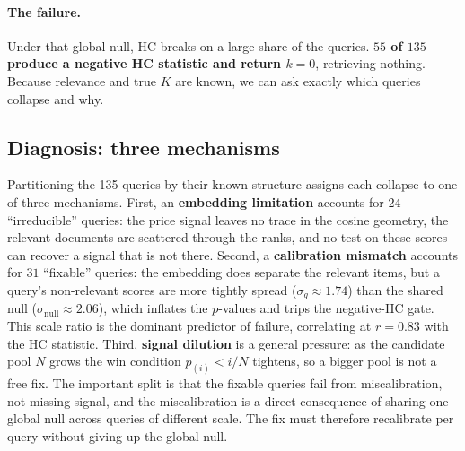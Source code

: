 \documentclass[letterpaper]{article}
\newcommand{\AmFailN}{55}\newcommand{\AmTotN}{135}
\newcommand{\AmIrrN}{24}\newcommand{\AmFixN}{31}\newcommand{\AmPosN}{77}
\newcommand{\AmSigQ}{1.74}\newcommand{\AmSigNull}{2.06}\newcommand{\AmStdCorr}{0.83}
\begin{document}
\paragraph{The failure.} Under that global null, HC breaks on a large
share of the queries. \textbf{$\AmFailN$ of $\AmTotN$ produce a negative
HC statistic and return $k{=}0$}, retrieving nothing. Because relevance
and true $K$ are known, we can ask exactly which queries collapse and
why.

\subsection{Diagnosis: three mechanisms}
Partitioning the 135 queries by their known structure assigns each
collapse to one of three mechanisms. First, an \textbf{embedding
limitation} accounts for $\AmIrrN$ ``irreducible'' queries: the price
signal leaves no trace in the cosine geometry, the relevant documents are
scattered through the ranks, and no test on these scores can recover a
signal that is not there. Second, a \textbf{calibration mismatch}
accounts for $\AmFixN$ ``fixable'' queries: the embedding does separate
the relevant items, but a query's non-relevant scores are more tightly
spread ($\sigma_q{\approx}\AmSigQ$) than the shared null
($\sigma_{\mathrm{null}}{\approx}\AmSigNull$), which inflates the
$p$-values and trips the negative-HC gate. This scale ratio is the
dominant predictor of failure, correlating at $r{=}\AmStdCorr$ with the
HC statistic. Third, \textbf{signal dilution} is a general pressure: as
the candidate pool $N$ grows the win condition $p_{(i)}<i/N$ tightens, so
a bigger pool is not a free fix. The important split is that the fixable
queries fail from miscalibration, not missing signal, and the
miscalibration is a direct consequence of sharing one global null across
queries of different scale. The fix must therefore recalibrate per query
without giving up the global null.
\end{document}
